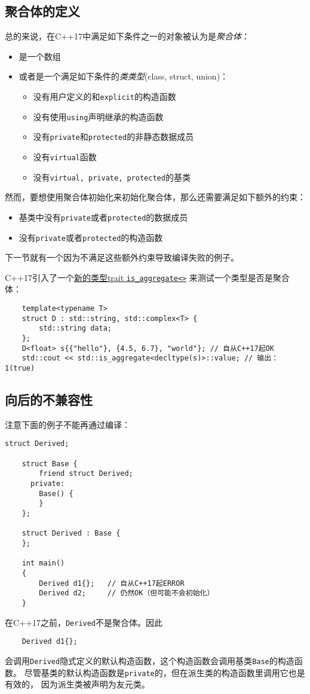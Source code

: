 \subsection{聚合体的定义}
总的来说，在C++17中满足如下条件之一的对象被认为是\emph{聚合体}：
\begin{itemize}[leftmargin=*]
    \item 是一个数组
    \item 或者是一个满足如下条件的\emph{类类型}(class, struct, union)：
    \begin{itemize}[leftmargin=*]
        \item 没有用户定义的和\texttt{explicit}的构造函数
        \item 没有使用\texttt{using}声明继承的构造函数
        \item 没有\texttt{private}和\texttt{protected}的非静态数据成员
        \item 没有\texttt{virtual}函数
        \item 没有\texttt{virtual, private, protected}的基类
    \end{itemize}
\end{itemize}
然而，要想使用聚合体初始化来初始化聚合体，那么还需要满足如下额外的约束：
\begin{itemize}[leftmargin=*]
    \item 基类中没有\texttt{private}或者\texttt{protected}的数据成员
    \item 没有\texttt{private}或者\texttt{protected}的构造函数
\end{itemize}
下一节就有一个因为不满足这些额外约束导致编译失败的例子。

C++17引入了一个\hyperref[ch21.2.1]{新的类型trait \texttt{is\_aggregate<>}}
来测试一个类型是否是聚合体：
\begin{lstlisting}
    template<typename T>
    struct D : std::string, std::complex<T> {
        std::string data;
    };
    D<float> s{{"hello"}, {4.5, 6.7}, "world"}; // 自从C++17起OK
    std::cout << std::is_aggregate<decltype(s)>::value; // 输出：1(true)
\end{lstlisting}

\subsection{向后的不兼容性}
注意下面的例子不能再通过编译：
\begin{lstlisting}[frame=single, title=lang/aggr14.cpp]
    struct Derived;

    struct Base {
        friend struct Derived;
      private:
        Base() {
        }
    };

    struct Derived : Base {
    };

    int main()
    {
        Derived d1{};   // 自从C++17起ERROR
        Derived d2;     // 仍然OK（但可能不会初始化）
    }
\end{lstlisting}
在C++17之前，\texttt{Derived}不是聚合体。因此
\begin{lstlisting}
    Derived d1{};
\end{lstlisting}
会调用\texttt{Derived}隐式定义的默认构造函数，这个构造函数会调用基类\texttt{Base}的构造函数。
尽管基类的默认构造函数是\texttt{private}的，但在派生类的构造函数里调用它也是有效的，
因为派生类被声明为友元类。

